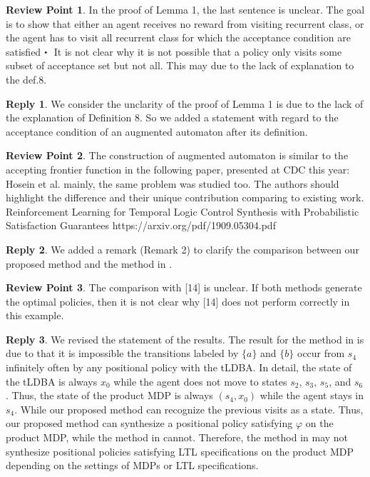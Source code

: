 \documentclass[10 pt, dvipdfmx]{article}
\theoremstyle{definition}
\newtheorem{review point}{Review Point}[section]
\newtheorem*{reply}{Reply}
\begin{document}
\begin{review point}
  In the proof of Lemma 1, the last sentence is unclear. The goal is to
show that either an agent receives no reward from visiting recurrent
class, or the agent has to visit all recurrent class for which the
acceptance condition are satisfied・ It is not clear why it is not
possible that a policy only visits some subset of acceptance set but
not all. This may due to the lack of explanation to the def.8.
\end{review point}

\begin{reply}
  We consider the unclarity of the proof of Lemma 1 is due to the lack of the explanation of Definition 8. So we added a statement with regard to the acceptance condition of an augmented automaton after its definition.
\end{reply}

\begin{review point}
  The construction of augmented automaton is similar to the accepting
frontier function in the following paper, presented at CDC this year: Hosein et
al.  mainly, the same problem was studied too. The authors should
highlight the difference and their unique contribution comparing to
existing work.
Reinforcement Learning for Temporal Logic Control Synthesis with
Probabilistic Satisfaction Guarantees
https://arxiv.org/pdf/1909.05304.pdf
\end{review point}

\begin{reply}
  We added a remark (Remark 2) to clarify the comparison between our proposed method and the method in \cite{HAK2019,HKAKPL2019}.
\end{reply}

\begin{review point}
  The comparison with [14] is unclear. If both methods generate the
optimal policies, then it is not clear why [14] does not perform
correctly in this example.
\end{review point}

\begin{reply}
  We revised the statement of the results. The result for the method in \cite{HAK2019} is due to that it is impossible the transitions labeled by $\{ a \}$ and $\{ b \}$ occur from $s_4$ infinitely often by any positional policy with the tLDBA. In detail, the state of the tLDBA is always $x_0$ while the agent does not move to states $s_2$, $s_3$, $s_5$, and $s_6$. Thus, the state of the product MDP is always $(s_4, x_0)$ while the agent stays in $s_4$. While our proposed method can recognize the previous visits as a state. Thus, our proposed method can synthesize a positional policy satisfying $\varphi$ on the product MDP, while the method in \cite{HAK2019} cannot. Therefore, the method in \cite{HAK2019} may not synthesize positional policies satisfying LTL specifications on the product MDP depending on the settings of MDPs or LTL specifications.
\end{reply}
\end{document}
